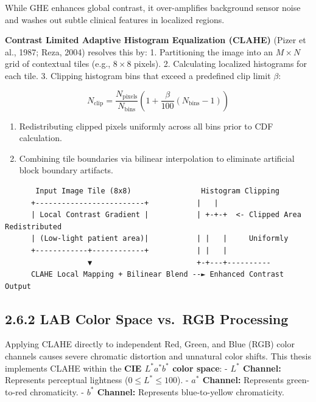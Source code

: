 While GHE enhances global contrast, it over-amplifies background sensor
noise and washes out subtle clinical features in localized regions.

\textbf{Contrast Limited Adaptive Histogram Equalization (CLAHE)} (Pizer
et al., 1987; Reza, 2004) resolves this by: 1. Partitioning the image
into an \(M \times N\) grid of contextual tiles (e.g., \(8 \times 8\)
pixels). 2. Calculating localized histograms for each tile. 3. Clipping
histogram bins that exceed a predefined clip limit \(\beta\):

\[N_{\text{clip}} = \frac{N_{\text{pixels}}}{N_{\text{bins}}} \left( 1 + \frac{\beta}{100} (N_{\text{bins}} - 1) \right)\]

\begin{enumerate}
\def\labelenumi{\arabic{enumi}.}
\setcounter{enumi}{3}
\tightlist
\item
  Redistributing clipped pixels uniformly across all bins prior to CDF
  calculation.
\item
  Combining tile boundaries via bilinear interpolation to eliminate
  artificial block boundary artifacts.
\end{enumerate}

\begin{verbatim}
       Input Image Tile (8x8)                Histogram Clipping
      +-------------------------+           |   |
      | Local Contrast Gradient |           | +-+-+  <- Clipped Area Redistributed
      | (Low-light patient area)|           | |   |     Uniformly
      +------------+------------+           | |   |
                   ▼                        +-+---+----------
      CLAHE Local Mapping + Bilinear Blend --► Enhanced Contrast Output
\end{verbatim}

\subsection{2.6.2 LAB Color Space vs.~RGB
Processing}\label{lab-color-space-vs.-rgb-processing}

Applying CLAHE directly to independent Red, Green, and Blue (RGB) color
channels causes severe chromatic distortion and unnatural color shifts.
This thesis implements CLAHE within the \textbf{CIE \(L^*a^*b^*\) color
space}: - \textbf{\(L^*\) Channel:} Represents perceptual lightness
(\(0 \le L^* \le 100\)). - \textbf{\(a^*\) Channel:} Represents
green-to-red chromaticity. - \textbf{\(b^*\) Channel:} Represents
blue-to-yellow chromaticity.

